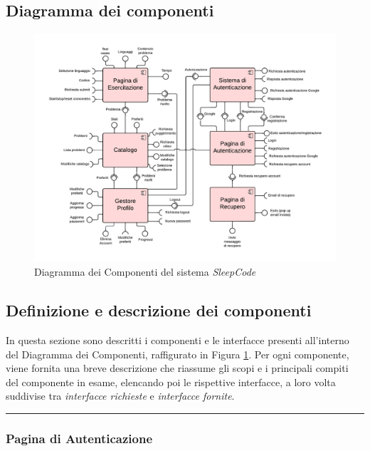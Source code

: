 \documentclass[11pt, a4paper]{article}
\theoremstyle{definition} %
\begin{document}
\subsection{Diagramma dei componenti}
\begin{figure}[H]
\centering
\hspace*{-3cm}
\includegraphics[scale = 0.87]{materiale/componentdiagram.pdf}
\caption{Diagramma dei Componenti del sistema \textit{SleepCode}}
\label{compdiagram}
\end{figure}

\newpage
\subsection{Definizione e descrizione dei componenti}
In questa sezione sono descritti i componenti e le interfacce presenti
all'interno del Diagramma dei Componenti, raffigurato in Figura \ref{compdiagram}.
Per ogni componente, viene fornita una breve descrizione che riassume gli
scopi e i principali compiti del componente in esame, elencando poi
le rispettive interfacce, a loro volta suddivise tra \textit{interfacce
richieste} e \textit{interfacce fornite}.

\begin{center}
    \rule{5cm}{1pt}
\end{center}

\subsubsection{Pagina di Autenticazione}
\end{document}
